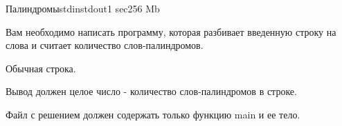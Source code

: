 \begin{problem}{Палиндромы}{stdin}{stdout}{1 sec}{256 Mb}

Вам необходимо написать программу, которая разбивает введенную строку на слова и считает количество слов-палиндромов.

\InputFile

Обычная строка.

\OutputFile

Вывод должен целое число - количество слов-палиндромов в строке.
\Example

\begin{example}
%
\end{example}

\Note

Файл с решением должен содержать только функцию main и ее тело.

\end{problem}